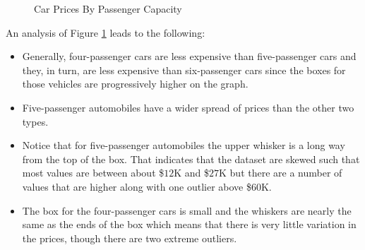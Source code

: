 \begin{figure}[H]
  \begin{center}
    \caption{Car Prices By Passenger Capacity}
    \label{vdi:img04}
  \end{center}
\end{figure}

An analysis of Figure \ref{vdi:img04} leads to the following:

\begin{itemize}
    \item Generally, four-passenger cars are less expensive than five-passenger cars and they, in turn, are less expensive than six-passenger cars since the boxes for those vehicles are progressively higher on the graph.
    \item Five-passenger automobiles have a wider spread of prices than the other two types. 
    \item Notice that for five-passenger automobiles the upper whisker is a long way from the top of the box. That indicates that the dataset are skewed such that most values are between about \$$ 12 $K and \$$ 27 $K but there are a number of values that are higher along with one outlier above \$$ 60 $K.
    \item The box for the four-passenger cars is small and the whiskers are nearly the same as the ends of the box which means that there is very little variation in the prices, though there are two extreme outliers.
\end{itemize}

